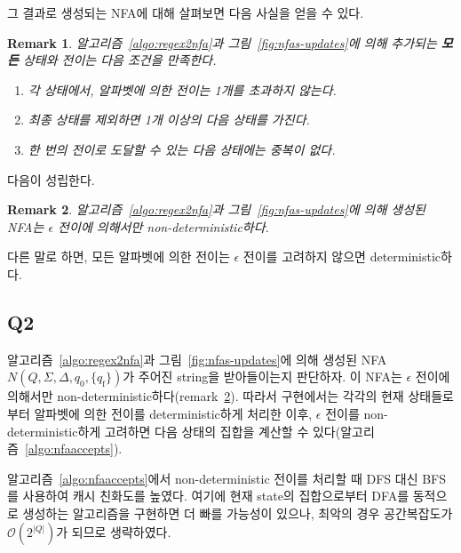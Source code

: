 \documentclass[a4paper,10pt]{scrartcl}
\newtheorem{remark}{Remark}[section]
\numberwithin{figure}{section}
\numberwithin{table}{section}
\begin{document}
그 결과로 생성되는 NFA에 대해 살펴보면 다음 사실을 얻을 수 있다.

\begin{remark}
  \label{remark:cond}
  알고리즘~\ref{algo:regex2nfa}과 그림~\ref{fig:nfas-updates}에 의해 추가되는 \textbf{모든} 상태와 전이는 다음 조건을 만족한다.
  \begin{enumerate}[label=\roman*.]
    \item \label{remark:cond:1} 각 상태에서, 알파벳에 의한 전이는 1개를 초과하지 않는다.
    \item \label{remark:cond:2} 최종 상태를 제외하면 1개 이상의 다음 상태를 가진다.
    \item \label{remark:cond:3} 한 번의 전이로 도달할 수 있는 다음 상태에는 중복이 없다.
  \end{enumerate}
\end{remark}

 다음이 성립한다.

\begin{remark}
  \label{remark:det}
  알고리즘~\ref{algo:regex2nfa}과 그림~\ref{fig:nfas-updates}에 의해 생성된 NFA는 $\epsilon$ 전이에 의해서만 non-deterministic하다.
\end{remark}

\noindent 다른 말로 하면, 모든 알파벳에 의한 전이는 $\epsilon$ 전이를 고려하지 않으면 deterministic하다.

\subsection{Q2}
\label{subsec:q2}

알고리즘~\ref{algo:regex2nfa}과 그림~\ref{fig:nfas-updates}에 의해 생성된 NFA $N(Q, \Sigma, \Delta, q_0, \{q_{\mathrm{f}}\})$가 주어진 string을 받아들이는지 판단하자. 이 NFA는 $\epsilon$ 전이에 의해서만 non-deterministic하다(remark~\ref{remark:det}). 따라서 구현에서는 각각의 현재 상태들로부터 알파벳에 의한 전이를 deterministic하게 처리한 이후, $\epsilon$ 전이를 non-deterministic하게 고려하면 다음 상태의 집합을 계산할 수 있다(알고리즘~\ref{algo:nfaaccepts}).

알고리즘~\ref{algo:nfaaccepts}에서 non-deterministic 전이를 처리할 때 DFS 대신 BFS를 사용하여 캐시 친화도를 높였다. 여기에 현재 state의 집합으로부터 DFA를 동적으로 생성하는 알고리즘을 구현하면 더 빠를 가능성이 있으나, 최악의 경우 공간복잡도가 $\mathcal{O}(2^{|Q|})$가 되므로 생략하였다.

\pagebreak
\end{document}
